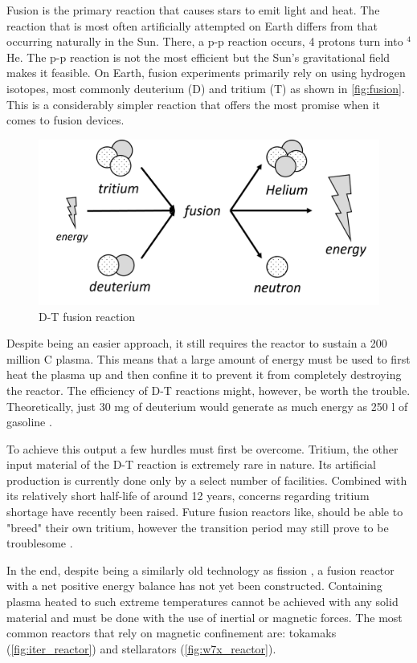   Fusion is the primary reaction that causes stars to emit light and heat.
  The reaction that is most often artificially attempted on Earth differs
  from that occurring naturally in the Sun. There, a p-p reaction occurs,
  4 protons turn into ${}^{4}$He. The p-p reaction is not the most efficient but
  the Sun's gravitational field makes it feasible.
  On Earth, fusion experiments primarily rely on using hydrogen isotopes, 
  most commonly deuterium (D) and tritium (T) as shown in \autoref{fig:fusion}.
  This is a considerably simpler reaction that offers the most promise
  when it comes to fusion devices.

  \begin{figure}[H]
	\centering
	\includegraphics[width=.75\linewidth]{media/fusion.png}
	\caption{D-T fusion reaction}
	\label{fig:fusion}
  \end{figure}

  Despite being an easier approach, it still requires the reactor to sustain
  a 200 million \degree C plasma. This means that a large amount of energy
  must be used to first heat the plasma up and then confine it to 
  prevent it from completely destroying the reactor. 
  The efficiency of D-T reactions might, however, be worth the trouble.
  Theoretically, just 30 mg of deuterium would generate as much energy
  as 250 l of gasoline \cite{nuclear_fusion_status}. 


  To achieve this output a few hurdles must first be overcome.
  Tritium, the other input material of the D-T reaction is
  extremely rare in nature. Its artificial production is currently 
  done only by a select number of facilities. 
  Combined with its relatively short half-life of around 12 years, 
  concerns regarding tritium shortage have recently been raised.
  Future fusion reactors like, should be able to "breed" their own tritium,
  however the transition period 
  may still prove to be troublesome \cite{fusion_fuel_running_out}.


  In the end, despite being a similarly old technology as fission
  \cite{fusion_history},
  a fusion reactor with a net positive energy balance
  has not yet been constructed. Containing plasma heated to such extreme
  temperatures cannot be achieved with any solid material and must 
  be done with the use of inertial or magnetic forces. 
  The most common reactors that rely on magnetic confinement are:
  tokamaks (\autoref{fig:iter_reactor}) 
  and stellarators (\autoref{fig:w7x_reactor}).
  \cite{tokamak_vs_stellarator}

